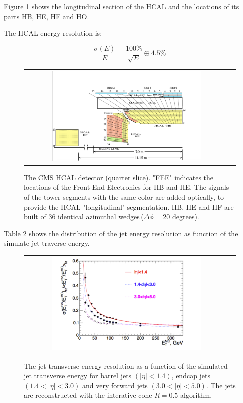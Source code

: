 Figure \ref{fig:HCAL_section} shows the longitudinal section of the HCAL and the locations of its parts HB, HE, HF and HO.

The HCAL energy resolution is:

\begin{equation}
\dfrac{\sigma(E)}{E} = \dfrac{100\%}{\sqrt{E}}\oplus 4.5\%
\end{equation}

\begin{figure}[tbh!]
	\centering
	\begin{tabular}{cc}
		\includegraphics[width=0.75\textwidth]{detector/pics/HCAL_section.png}
	\end{tabular}
	\caption{The CMS HCAL detector (quarter slice). "FEE" indicates the locations of the Front End Electronics for HB and HE. The signals of the tower segments with the same color are added optically, to provide the HCAL "longitudinal" segmentation. HB, HE and HF are built of 36 identical azimuthal wedges\,($\Delta\phi = 20$ degrees).}
	\label{fig:HCAL_section}
\end{figure}

Table \ref{fig:HCAL_resolution} shows the distribution of the jet energy resolution as function of the simulate jet traverse energy.

\begin{figure}[tbh!]
	\centering
	\begin{tabular}{cc}
		\includegraphics[width=0.75\textwidth]{detector/pics/HCAL_resolution.pdf}
	\end{tabular}
	\caption{The jet transverse energy resolution as a function of the simulated jet transverse energy for barrel jets $(|\eta| < 1.4)$, endcap jets $(1.4 < |\eta| < 3.0)$ and very forward jets $(3.0 < | \eta | < 5.0)$. The jets are reconstructed with the interative cone $R = 0.5$ algorithm.}
	\label{fig:HCAL_resolution}
\end{figure}

